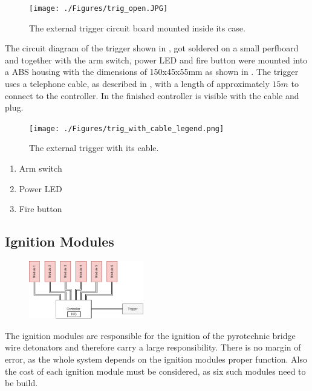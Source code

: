 \begin{figure}[!ht]
    \centering
    \texttt{[image: ./Figures/trig\_open.JPG]}
    \caption{The external trigger circuit board mounted inside its case.}
    \label{fig:trig_open}     
\end{figure}

\noindent The circuit diagram of the trigger shown in , got soldered on a small perfboard and together with the arm switch, power LED and fire button were mounted into a ABS housing with the dimensions of 150x45x55mm as shown in . The trigger uses a telephone cable, as described in , with a length of approximately $15m$ to connect to the controller. In  the finished controller is visible with the cable and plug.

\begin{figure}[!ht]
    \centering
    \texttt{[image: ./Figures/trig\_with\_cable\_legend.png]}
    \caption{The external trigger with its cable.}
    \label{fig:trig_with_cable_legend}     
\end{figure}

\begin{enumerate}
	\item Arm switch
	\item Power LED
	\item Fire button
\end{enumerate}

\pagebreak

\subsection{Ignition Modules}
\label{Ignition Modules}

\begin{figure}[!ht]
    \centering
    \includegraphics[width=5cm]{./Figures/concept_modules.png} 
\end{figure}

\noindent The ignition modules are responsible for the ignition of the pyrotechnic bridge wire detonators and therefore carry a large responsibility. There is no margin of error, as the whole system depends on the ignition modules proper function. Also the cost of each ignition module must be considered, as six such modules need to be build.

